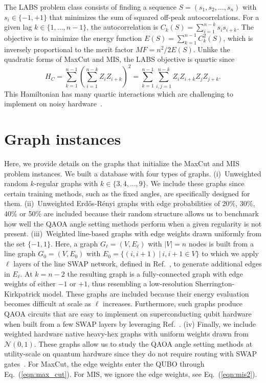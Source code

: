 \documentclass[twocolumn,
english,
aps,
pra,
10pt,
longbibliography,
superscriptaddress,
amsmath,
amssymb,
floatfix
]{revtex4-2}
\begin{document}
{The LABS problem class consists of finding a sequence $S = (s_1, s_2, \dots, s_n)$ with $s_i \in \{-1, +1\}$ that minimizes the sum of squared off-peak autocorrelations. 
For a given lag $k \in \{1, \dots, n-1\}$, the autocorrelation is $C_k(S) = \sum_{i=1}^{n-k} s_i s_{i+k}$. 
The objective is to minimize the energy function $E(S) = \sum_{k=1}^{n-1} C_k^2(S)$, which is inversely proportional to the merit factor $MF = n^2 / 2E(S)$.
Unlike the quadratic forms of MaxCut and MIS, the LABS objective is quartic since
\begin{equation}
    H_C = \sum_{k=1}^{n-1} \left( \sum_{i=1}^{n-k} Z_i Z_{i+k} \right)^2 = \sum_{k=1}^{n-1} \sum_{i,j=1}^{n-k} Z_i Z_{i+k} Z_j Z_{j+k}.
    \label{eq:labs_hamiltonian}
\end{equation}
This Hamiltonian has many quartic interactions which are challenging to implement on noisy hardware~\cite{Dragoi2025}.

\section{Graph instances\label{app:graphs}}

Here, we provide details on the graphs that initialize the MaxCut and MIS problem instances.
We built a database with four types of graphs.
(i)~Unweighted random $k$-regular graphs with $k\in\{3, 4,...,9\}$.
We include these graphs since certain training methods, such as the fixed angles, are specifically designed for them.
(ii)~Unweighted Erd\H{o}s-R\'{e}nyi graphs with edge probabilities of 20\%, 30\%, 40\% or 50\% are included because their random structure allows us to benchmark how well the QAOA angle setting methods perform when a given regularity is not present.
(iii)~Weighted line-based graphs with edge weights drawn uniformly from the set $\{-1, 1\}$.
Here, a graph $G_{\ell}=(V, E_\ell)$ with $|V|=n$ nodes is built from a line graph $G_{0}=(V, E_0)$ with $E_0=\{(i,i+1)~|~i,i+1\in V\}$ to which we apply $\ell$ layers of the line SWAP network, defined in Ref.~\cite{Weidenfeller2022}, to generate additional edges in $E_\ell$.
At $k=n-2$ the resulting graph is a fully-connected graph with edge weights of either $-1$ or $+1$, thus resembling a low-resolution Sherrington-Kirkpatrick model.
These graphs are included because their energy evaluation becomes difficult at scale as $\ell$ increases. 
Furthermore, such graphs produce QAOA circuits that are easy to implement on superconducting qubit hardware when built from a few SWAP layers by leveraging Ref.~\cite{Weidenfeller2022}.
(iv) Finally, we include weighted hardware native heavy-hex graphs with uniform weights drawn from $\mathcal{N}(0, 1)$.
These graphs allow us to study the QAOA angle setting methods at utility-scale on quantum hardware since they do not require routing with SWAP gates~\cite{Montanezbarrera2024}.
For MaxCut, the edge weights enter the QUBO through Eq.~(\ref{eqn:max_cut}).
For MIS, we ignore the edge weights, see Eq.~(\ref{eqn:mis2}).

}
\end{document}
